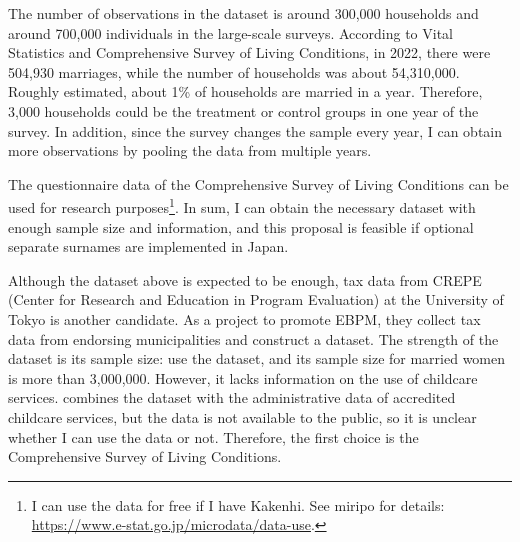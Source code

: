 \documentclass[12pt]{article}
\begin{document}
The number of observations in the dataset is around 300,000 households and around 700,000 individuals in the large-scale surveys.
According to Vital Statistics and Comprehensive Survey of Living Conditions, in 2022, there were 504,930 marriages, while the number of households was about 54,310,000. 
Roughly estimated, about 1\% of households are married in a year.
Therefore, 3,000 households could be the treatment or control groups in one year of the survey. 
In addition, since the survey changes the sample every year, I can obtain more observations by pooling the data from multiple years.


The questionnaire data of the Comprehensive Survey of Living Conditions can be used for research purposes\footnote{
  I can use the data for free if I have Kakenhi. 
  See miripo for details: \url{https://www.e-stat.go.jp/microdata/data-use}.
}.
In sum, I can obtain the necessary dataset with enough sample size and information, and this proposal is feasible if optional separate surnames are implemented in Japan.


Although the dataset above is expected to be enough, tax data from CREPE (Center for Research and Education in Program Evaluation) at the University of Tokyo is another candidate.
As a project to promote EBPM, they collect tax data from endorsing municipalities and construct a dataset. 
The strength of the dataset is its sample size: \cite[Kondo and Fukai]{kondo2023} use the dataset, and its sample size for married women is more than 3,000,000. 
However, it lacks information on the use of childcare services. 
\cite{kondo2024} combines the dataset with the administrative data of accredited childcare services, but the data is not available to the public, so it is unclear whether I can use the data or not.
Therefore, the first choice is the Comprehensive Survey of Living Conditions.



\nocite{*}


\end{document}
